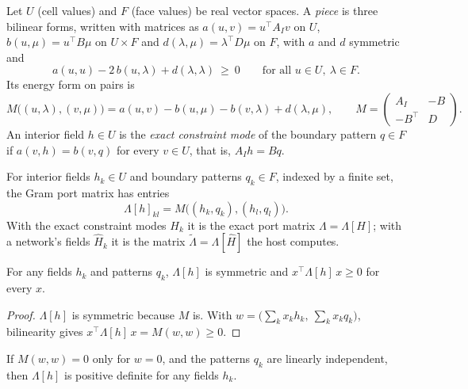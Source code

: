 \begin{definition}\label{def:piece}
  \leanok
  Let $U$ (cell values) and $F$ (face values) be real vector spaces.  A
  \emph{piece} is three bilinear forms, written with matrices as
  $a(u,v)=u^\top A_Iv$ on $U$, $b(u,\mu)=u^\top B\mu$ on $U\times F$ and
  $d(\lambda,\mu)=\lambda^\top D\mu$ on $F$, with $a$ and $d$ symmetric and
  \[
    a(u,u)-2\,b(u,\lambda)+d(\lambda,\lambda)\ \ge\ 0
    \qquad\text{for all }u\in U,\ \lambda\in F .
  \]
  Its energy form on pairs is
  \[
    M\bigl((u,\lambda),(v,\mu)\bigr)=a(u,v)-b(u,\mu)-b(v,\lambda)+d(\lambda,\mu),
    \qquad M=\begin{pmatrix}A_I&-B\\-B^\top&D\end{pmatrix}.
  \]
  An interior field $h\in U$ is the \emph{exact constraint mode} of the
  boundary pattern $q\in F$ if $a(v,h)=b(v,q)$ for every $v\in U$, that is,
  $A_Ih=Bq$.
\end{definition}

\begin{definition}\label{def:gram}
  \leanok
  For interior fields $h_k\in U$ and boundary patterns $q_k\in F$, indexed by a
  finite set, the Gram port matrix has entries
  \[
    \Lambda[h]_{kl}=M\bigl((h_k,q_k),(h_l,q_l)\bigr).
  \]
  With the exact constraint modes $H_k$ it is the exact port matrix
  $\Lambda=\Lambda[H]$; with a network's fields $\hat H_k$ it is the matrix
  $\tilde\Lambda=\Lambda[\hat H]$ the host computes.
\end{definition}

\begin{theorem}\label{thm:T25-i}
  \leanok
  For any fields $h_k$ and patterns $q_k$, $\Lambda[h]$ is symmetric and
  $x^\top\Lambda[h]\,x\ge0$ for every $x$.
\end{theorem}

\begin{proof}
  \leanok
  $\Lambda[h]$ is symmetric because $M$ is.  With
  $w=\bigl(\sum_kx_kh_k,\ \sum_kx_kq_k\bigr)$, bilinearity gives
  $x^\top\Lambda[h]\,x=M(w,w)\ge0$.
\end{proof}

\begin{proposition}\label{prop:T25-i-def}
  \leanok
  If $M(w,w)=0$ only for $w=0$, and the patterns $q_k$ are linearly
  independent, then $\Lambda[h]$ is positive definite for any fields $h_k$.
\end{proposition}


